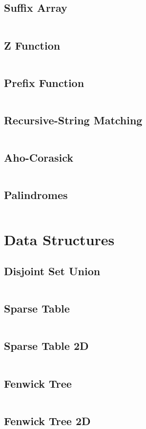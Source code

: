 \documentclass[a4paper, 10pt, twocolumn, landscape]{article}
\begin{document}
  \subsection{Suffix Array}
  \inputminted{cpp}{strings/suffix-array.cpp}
  \subsection{Z Function}
  \inputminted{cpp}{strings/z.cpp}
  \subsection{Prefix Function}
  \inputminted{cpp}{strings/prefix.cpp}
  \subsection{Recursive-String Matching}
  \inputminted{cpp}{strings/recursive-string-matching.cpp}
  \subsection{Aho-Corasick}
  \inputminted{cpp}{strings/aho.cpp}
  \subsection{Palindromes}
  \inputminted{cpp}{strings/manacher.cpp}

  \section{Data Structures}
  \subsection{Disjoint Set Union}
  \inputminted{cpp}{data-structures/dsu.cpp}
  \subsection{Sparse Table}
  \inputminted{cpp}{data-structures/sparse.cpp}
  \subsection{Sparse Table 2D}
  \inputminted{cpp}{data-structures/sparse2d.cpp}
  \subsection{Fenwick Tree}
  \inputminted{cpp}{data-structures/bit.cpp}
  \subsection{Fenwick Tree 2D}
  \inputminted{cpp}{data-structures/bit2d.cpp}
\end{document}
